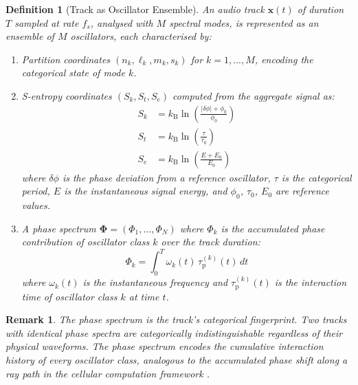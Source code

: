 \documentclass[11pt,twocolumn,a4paper]{article}
\newtheorem{definition}[theorem]{Definition}
\newtheorem{remark}[theorem]{Remark}
\newcommand{\kB}{k_{\mathrm{B}}}
\newcommand{\Sk}{S_k}
\newcommand{\St}{S_t}
\newcommand{\Se}{S_e}
\newcommand{\Spec}{\bm{\Phi}}
\begin{document}
\begin{definition}[Track as Oscillator Ensemble]
\label{def:track-ensemble}
An audio track $\mathbf{x}(t)$ of duration $T$ sampled at rate $f_s$,
analysed with $M$ spectral modes, is represented as an ensemble of $M$
oscillators, each characterised by:
\begin{enumerate}[label=(\roman*),leftmargin=*]
\item Partition coordinates $(n_k, \ell_k, m_k, s_k)$ for $k = 1,
  \ldots, M$, encoding the categorical state of mode $k$.
\item S-entropy coordinates $(\Sk, \St, \Se)$ computed from the
  aggregate signal as:
  \begin{align}
    \Sk &= \kB \ln\!\left(\frac{|\delta\phi| + \phi_0}{\phi_0}\right)
    \label{eq:sk} \\
    \St &= \kB \ln\!\left(\frac{\tau}{\tau_0}\right)
    \label{eq:st} \\
    \Se &= \kB \ln\!\left(\frac{E + E_0}{E_0}\right)
    \label{eq:se}
  \end{align}
  where $\delta\phi$ is the phase deviation from a reference
  oscillator, $\tau$ is the categorical period, $E$ is the
  instantaneous signal energy, and $\phi_0$, $\tau_0$, $E_0$ are
  reference values.
\item A phase spectrum $\Spec = (\Phi_1, \ldots, \Phi_N)$ where
  $\Phi_k$ is the accumulated phase contribution of oscillator class
  $k$ over the track duration:
  \begin{equation}
    \Phi_k = \int_0^T \omega_k(t)\, \tau_{\mathrm{p}}^{(k)}(t)\, dt
    \label{eq:phase-accumulation}
  \end{equation}
  where $\omega_k(t)$ is the instantaneous frequency and
  $\tau_{\mathrm{p}}^{(k)}(t)$ is the interaction time of oscillator
  class $k$ at time $t$.
\end{enumerate}
\end{definition}

\begin{remark}
The phase spectrum is the track's categorical fingerprint. Two tracks
with identical phase spectra are categorically indistinguishable
regardless of their physical waveforms. The phase spectrum encodes the
cumulative interaction history of every oscillator class, analogous to
the accumulated phase shift along a ray path in the cellular
computation framework \citep{sachikonye2026raytracing}.
\end{remark}
\end{document}

